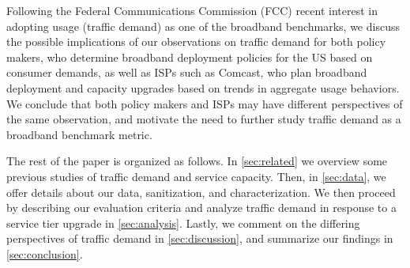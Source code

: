 Following the Federal Communications Commission (FCC) recent interest in 
adopting usage (traffic demand) as one of the broadband benchmarks, we discuss 
the possible implications of our observations on traffic demand for both policy 
makers, who determine broadband deployment policies for the US based on consumer 
demands, as well as ISPs such as Comcast, who plan broadband deployment and 
capacity upgrades based on trends in aggregate usage behaviors. We conclude that 
both policy makers and ISPs may have different perspectives of the same 
observation, and motivate the need to further study traffic demand as a 
broadband benchmark metric.

The rest of the paper is organized as follows. In \autoref{sec:related} we 
overview some previous studies of traffic demand and service capacity. Then, in 
\autoref{sec:data}, we offer details about our data, sanitization, and 
characterization. We then proceed by describing our evaluation criteria and 
analyze traffic demand in response to a service tier upgrade in 
\autoref{sec:analysis}.
Lastly, we comment on the differing perspectives of traffic demand in 
\autoref{sec:discussion}, and summarize our findings in 
\autoref{sec:conclusion}.
